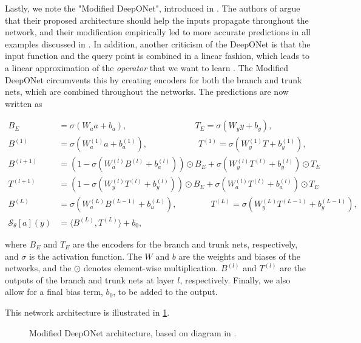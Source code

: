 Lastly, we note the "Modified DeepONet", introduced in . 
The authors of \cite{wangImprovedArchitecturesTraining2022a} argue that their
proposed architecture should help the inputs propagate throughout the network, and their modification empirically led to more 
accurate predictions in all examples discussed in \cite{wangImprovedArchitecturesTraining2022a}.
In addition, another criticism of the DeepONet is that the input function and the query point is combined in a linear fashion, which leads to a linear 
approximation of the \textit{operator} that we want to learn .
The Modified DeepONet circumvents this by creating encoders for both the branch and trunk nets, which are combined throughout
the networks. The predictions are now written as

\begin{align*}
    B_E &= \sigma(W_a a + b_a), \qquad\qquad\qquad\qquad T_E = \sigma(W_yy + b_y), \\
    B^{(1)} &= \sigma(W_a^{(1)} a + b_a^{(1)}), \qquad\qquad\qquad T^{(1)} = \sigma(W_y^{(1)}T + b_y^{(1)}), \\
    B^{(l+1)} &= (1- \sigma(W_a^{(l)}B^{(l)}+b_a^{(l)})) \odot B_E + \sigma(W_y^{(l)}T^{(l)}+b_y^{(l)}) \odot T_E\\
    T^{(l+1)} &= (1- \sigma(W_y^{(l)}T^{(l)}+b_y^{(l)})) \odot B_E + \sigma(W_a^{(l)}T^{(l)}+b_a^{(l)}) \odot T_E\\
    B^{(L)} &= \sigma(W_a^{(L)} B^{(L-1)} + b_u^{(L)}), \qquad\qquad T^{(L)} = \sigma(W_y^{(L)}T^{(L-1)} + b_y^{(L-1)}), \\
    \mathcal{S}_\theta[a](y) &= \langle B^{(L)}, T^{(L)}\rangle + b_0,
\end{align*}

where \(B_E\) and \(T_E\) are the encoders for the branch and trunk nets, respectively, and \(\sigma\) is the activation function.
The \(W\) and \(b\) are the weights and biases of the networks, and the \(\odot\) denotes element-wise multiplication.
\(B^{(l)}\) and \(T^{(l)}\) are the outputs of the branch and trunk nets at layer \(l\), respectively.
Finally, we also allow for a final bias term, \(b_0\), to be added to the output.

This network architecture is illustrated in \cref{fig:Modified_DeepONet}.

\begin{figure}[h!]
    \centering
    
    \caption[Modified DeepONet architecture]{Modified DeepONet architecture, based on diagram in \cite{wangImprovedArchitecturesTraining2022a}.}
    \label{fig:Modified_DeepONet}
\end{figure}
 
